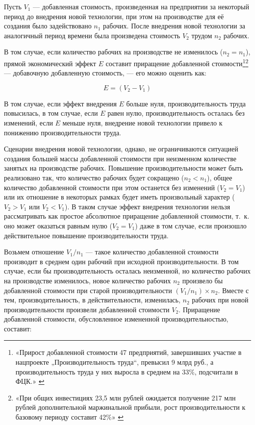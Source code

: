 \documentclass{article}
\begin{document}
Пусть $V_1$ — добавленная стоимость, произведенная на предприятии за некоторый период до внедрения новой технологии, при этом на производстве для её создания было задействовано $n_1$ рабочих. После внедрения новой технологии за аналогичный период времени была произведена стоимость $V_2$ трудом $n_2$ рабочих.

В том случае, если количество рабочих на производстве не изменилось ($n_2 = n_1$), прямой экономический эффект $E$ составит приращение добавленной стоимости\footnote{«Прирост добавленной стоимости 47 предприятий, завершивших участие в нацпроекте „Производительность труда“, превысил 9 млрд руб., а производительность труда у них выросла в среднем на 33\%, подсчитали в ФЦК.» \cite{vedomostiRussianIndustryEfficiency2024}}\footnote{«При общих инвестициях 23,5 млн рублей ожидается получение 217 млн рублей дополнительной маржинальной прибыли, рост производительности к базовому периоду составит 42\%» \cite{minecoLabourProductivityProjectPresentation2023}} — добавочную добавленную стоимость, — его можно оценить как:

$$E = (V_2 - V_1)$$

В том случае, если эффект внедрения $E$ больше нуля, производительность труда повысилась, в том случае, если $E$ равен нулю, производительность осталась без изменений, если $E$ меньше нуля, внедрение новой технологии привело к понижению производительности труда.

Сценарии внедрения новой технологии, однако, не ограничиваются ситуацией создания большей массы добавленной стоимости при неизменном количестве занятых на производстве рабочих. Повышение производительности может быть реализовано так, что количество рабочих будет сокращено ($n_2 < n_1$), общее количество добавленной стоимости при этом останется без изменений ($V_2 = V_1$) или их отношение в некоторых рамках будет иметь произвольный характер ($V_2 > V_1$ или $V_2 < V_1$). В таком случае эффект внедрения технологии нельзя рассматривать как простое абсолютное приращение добавленной стоимости, т.~к. оно может оказаться равным нулю ($V_2 = V_1$) даже в том случае, если произошло действительное повышение производительности труда.

Возьмем отношение $V_1 / n_1$ — такое количество добавленной стоимости производит в среднем один рабочий при исходной производительности. В том случае, если бы производительность осталась неизменной, но количество рабочих на производстве изменилось, новое количество рабочих $n_2$ произвело бы добавленной стоимости при старой производительности $(V_1 / n_1) \times n_2$. Вместе с тем, производительность, в действительности, изменилась, $n_2$ рабочих при новой производительности произвели добавленной стоимости $V_2$. Приращение добавленной стоимости, обусловленное измененной производительностью, составит:
\end{document}
